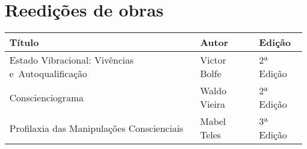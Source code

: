 \documentclass{gescons}
\begin{document}
\section*{Reedições de obras}

\begin{longtable}[]{@{}
  >{\raggedright\arraybackslash}p{}
  >{\raggedright\arraybackslash}p{}
  >{\raggedright\arraybackslash}p{}@{}}
\toprule\noalign{}
\begin{minipage}[b]{\linewidth}\centering
\textbf{Título}
\end{minipage} & \begin{minipage}[b]{\linewidth}\centering
\textbf{Autor}
\end{minipage} & \begin{minipage}[b]{\linewidth}\centering
\textbf{Edição}
\end{minipage} \\
\hline
\begin{minipage}[b]{\linewidth}\raggedright
Estado Vibracional: Vivências e~Autoqualificação
\end{minipage} & \begin{minipage}[b]{\linewidth}\raggedright
Victor Bolfe
\end{minipage} & \begin{minipage}[b]{\linewidth}\centering
2ª Edição
\end{minipage} \\
\hline
\begin{minipage}[b]{\linewidth}\raggedright
Conscienciograma
\end{minipage} & \begin{minipage}[b]{\linewidth}\raggedright
Waldo Vieira
\end{minipage} & \begin{minipage}[b]{\linewidth}\centering
2ª Edição
\end{minipage} \\
\hline
\begin{minipage}[b]{\linewidth}\raggedright
Profilaxia das Manipulações Conscienciais
\end{minipage} & \begin{minipage}[b]{\linewidth}\raggedright
Mabel Teles
\end{minipage} & \begin{minipage}[b]{\linewidth}\centering
3ª Edição
\end{minipage} \\

\end{longtable}
\end{document}
